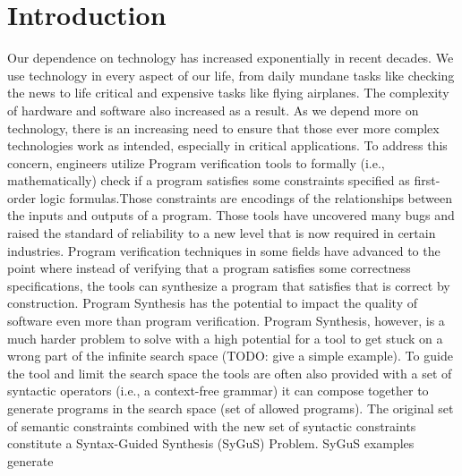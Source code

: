 \section{Introduction}
\label{sec:introduction}
%
Our dependence on technology has increased exponentially in recent decades.
%
We use technology in every aspect of our life, from daily mundane tasks like checking the news to life critical and expensive tasks like flying airplanes.
%
The complexity of hardware and software also increased as a result.
%
As we depend more on technology, there is an increasing need to ensure that those ever more complex technologies work as intended, especially in critical applications.
%
To address this concern, engineers utilize Program verification tools to formally (i.e., mathematically) check if a program satisfies some constraints specified as first-order logic formulas.Those constraints are encodings of the relationships between the inputs and outputs of a program.
%
Those tools have uncovered many bugs and raised the standard of reliability to a new level that is now required in certain industries.
%
Program verification techniques in some fields have advanced to the point where instead of verifying that a program satisfies some correctness specifications, the tools can synthesize a program that satisfies that is correct by construction.
%
Program Synthesis has the potential to impact the quality of software even more than program verification.
%
Program Synthesis, however, is a much harder problem to solve with a high potential for a tool to get stuck on a wrong part of the infinite search space (TODO: give a simple example).
%
To guide the tool and limit the search space the tools are often also provided with a set of syntactic operators (i.e., a context-free grammar) it can compose together to generate programs in the search space (set of allowed programs).
%
The original set of semantic constraints combined with the new set of syntactic constraints constitute a Syntax-Guided Synthesis (SyGuS) Problem.
%
SyGuS examples generate 
